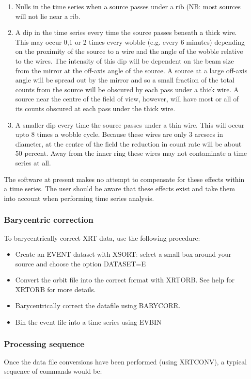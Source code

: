 \documentclass{book}
\renewcommand{\_}{{\tt\char'137}}     %
\begin{document}
\begin{enumerate}
\item Nulls in the time series when a source passes under a rib (NB:
most sources will not lie near a rib.
\item A dip in the time series every time the source passes beneath a
thick wire. This may occur 0,1 or 2 times every wobble (e.g. every
6 minutes) depending on the proximity of the source to a wire and
the angle of the wobble relative to the wires. The intensity of this
dip will be dependent on the beam size from the mirror at the
off-axis angle of the source. A source at a large off-axis angle
will be spread out by the mirror and so a small fraction of the
total counts from the source will be obscured by each pass under
a thick wire. A source near the centre of the field of view,
however, will have most or all of its counts obscured at each pass
under the thick wire.
\item A smaller dip every time the source passes under a thin wire.
This will occur upto 8 times a wobble cycle. Because these wires
are only 3 arcsecs in diameter, at the centre of the field
the reduction in count rate will be about 50 percent. Away from the
inner ring these wires may not contaminate a time series at all.
\end{enumerate}
The software at present makes no attempt to compensate for these effects
within a time series. The user should be aware that these effects exist
and take them into account when performing time series analysis.

\subsubsection{Barycentric correction}
To barycentrically correct XRT data, use the following procedure:
\begin{itemize}
\item Create an EVENT dataset with XSORT: select a small box around
your source and choose the option DATASET=E
\item Convert the orbit file into the correct format with XRTORB. See
help for XRTORB for more details.
\item Barycentrically correct the datafile using BARYCORR.
\item Bin the event file into a time series using EVBIN
\end{itemize}
\subsubsection{Processing sequence}
Once the data file conversions have been performed (using XRTCONV), a
typical sequence of commands would be:
\end{document}
